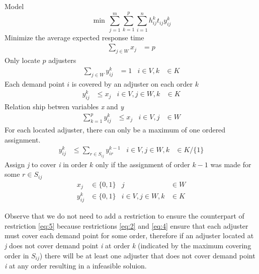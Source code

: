 Model
{\small
  \begin{equation}
    \min \, \sum_{j=1}^{m}{
      \sum_{k=1}^{p}{
        \sum_{i=1}^{n}{
          h_{ij}^{k}t_{ij}y_{ij}^{k}
        }
      }
    }
  \end{equation}
}
Minimize the average expected response time
\begin{align}
  \label{eq:2}
  \sum_{j \in W}{x_j}
  & = p
\end{align}
Only locate $p$ adjusters
\begin{align}
  \label{eq:3}
  \sum_{j \in W}{y_{ij}^{k}}
  & = 1
  & i \in V, k
  &\in K
\end{align}
Each demand point $i$ is covered by an adjuster on each order $k$
\begin{align}
  \label{eq:4}
  y_{ij}^{k}
  & \leq x_j
  & i \in V,j \in W, k
  &\in K
\end{align}
Relation ship betwen variables \textit{x} and \textit{y}
\begin{align}
  \label{eq:5}
  \sum_{k = 1}^{p}{
    y_{ij}^{k}
  }
  & \leq x_j
  & i \in V, j 
  & \in W
\end{align}
For each located adjuster,
there can only be
a maximum of one ordered assignment.
\begin{align}
  y_{ij}^{k} 
  & \leq \sum_{r\in S_{ij}}{y_{ir}^{k-1}}
  & i \in V,j \in W, k
  & \in K/\{1\}
\end{align}
Assign \textit{j} to cover \textit{i} in order $k$
only if
the assignment of order $k-1$
was made for some $r \in S_{ij}$
\begin{align}
  x_{j}
  & \in \{0,1\}
  & j 
  & \in W \nonumber
  \\
  y_{ij}^{k}
  & \in \{0,1\}
  &  i \in V,j \in W,k
  &\in K \nonumber
\end{align}

Observe that
we do not need
to add a restriction
to ensure
the counterpart of restriction \ref{eq:5}
because restrictions \ref{eq:2} and \ref{eq:4}
ensure that
each adjuster
must cover each demand point
for some order,
therefore
if an adjuster located at \textit{j}
does not cover demand point \textit{i}
at order \textit{k}
(indicated by
the maximum covering order in $S_{ij}$)
there will be at least
one adjuster
that does not cover
demand point \textit{i}
at any order
resulting in a infeasible soluion.

